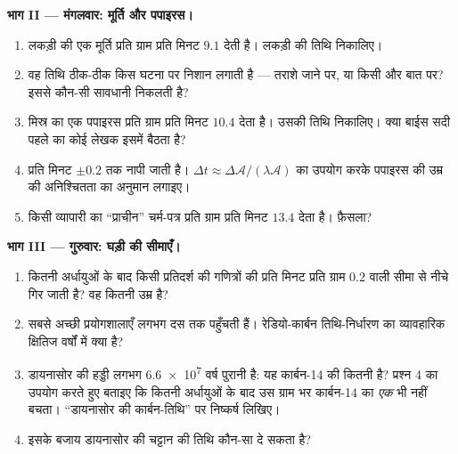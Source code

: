 \begin{problem}
\medskip
\noindent\textbf{भाग II --- मंगलवार: मूर्ति और पपाइरस।}
\begin{enumerate}[resume]
  \item लकड़ी की एक मूर्ति प्रति ग्राम प्रति मिनट $9.1$  देती है। लकड़ी
        की तिथि निकालिए।
  \item वह तिथि ठीक-ठीक किस घटना पर निशान लगाती है --- तराशे जाने पर, या
        किसी और बात पर? इससे कौन-सी सावधानी निकलती है?
  \item मिस्र का एक पपाइरस प्रति ग्राम प्रति मिनट $10.4$  देता है। उसकी
        तिथि निकालिए। क्या बाईस सदी पहले का कोई लेखक इसमें बैठता है?
  \item {} प्रति मिनट $\pm 0.2$  तक नापी जाती है। $\Delta t \approx \Delta\mathcal A/(\lambda \mathcal A)$ का
        उपयोग करके पपाइरस की उम्र की अनिश्चितता का अनुमान लगाइए।
  \item किसी व्यापारी का ``प्राचीन'' चर्म-पत्र प्रति ग्राम प्रति मिनट $13.4$
         देता है। फ़ैसला?
\end{enumerate}

\medskip
\noindent\textbf{भाग III --- गुरुवार: घड़ी की सीमाएँ।}
\begin{enumerate}[resume]
  \item कितनी अर्धायुओं के बाद किसी प्रतिदर्श की  गणित्रों की
        प्रति मिनट प्रति ग्राम $0.2$  वाली सीमा से नीचे गिर जाती है? वह
        कितनी उम्र है?
  \item सबसे अच्छी प्रयोगशालाएँ लगभग दस  तक पहुँचती हैं।
        रेडियो-कार्बन तिथि-निर्धारण का व्यावहारिक क्षितिज वर्षों में क्या है?
  \item डायनासोर की हड्डी लगभग \num{6.6e7} वर्ष पुरानी है: यह कार्बन-14 की कितनी
         है? प्रश्न 4 का उपयोग करते हुए बताइए कि कितनी अर्धायुओं के बाद
        उस ग्राम भर कार्बन-14 का \emph{एक}  भी नहीं बचता।
        ``डायनासोर की कार्बन-तिथि'' पर निष्कर्ष लिखिए।
  \item इसके बजाय डायनासोर की चट्टान की तिथि कौन-सा  दे
        सकता है?
\end{enumerate}


\end{problem}
